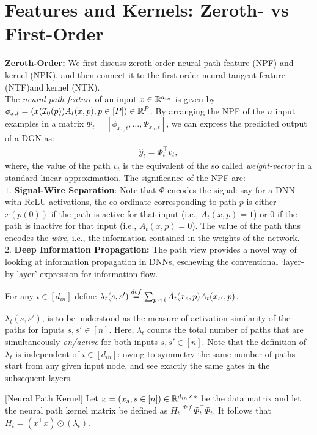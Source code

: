 \section{Features and Kernels: Zeroth- vs First-Order}
\textbf{Zeroth-Order:} We first discuss zeroth-order neural path feature (NPF) and kernel (NPK), and then connect it to the first-order neural tangent feature  (NTF)and kernel (NTK).\hfill\\
The \emph{neural path feature} of an input $x\in \mathbb{R}^{d_{in}}$ is given by $\phi_{x,t}=(x(\mathcal{I}_0(p))A_t(x,p) ,p\in[P])\in\mathbb{R}^P$. By arranging the NPF of the $n$ input examples in a matrix $\Phi_t=\left[\phi_{x_1,t},\ldots, \Phi_{x_n,t}\right]$, we can express the predicted output of a DGN as: \begin{align}\label{eq:npfbasic}\hat{y}_t=\Phi_t^\top v_t,\end{align}
where, the value of the path $v_t$ is the equivalent of the so called \emph{weight-vector} in a standard linear approximation. The significance of the NPF are:\hfill\\
$1.$ \textbf{Signal-Wire Separation}: Note that $\Phi$ encodes the signal: say for a DNN with ReLU activations, the co-ordinate corresponding to path $p$ is either $x(p(0))$ if the path is active for that input (i.e., $A_t(x,p)=1$) or $0$ if the path is inactive for that input  (i.e., $A_t(x,p)=0$). The value of the path thus encodes the \emph{wire}, i.e., the information contained in the weights of the network. \hfill\\
$2.$ \textbf{Deep Information Propagation:} The path view provides a novel way of looking at information propagation in DNNs, eschewing the conventional `layer-by-layer' expression for information flow.\hfill\\
\begin{definition}\label{def:lambda}
 For any $i\in [d_{in}]$ define $\lambda_t(s,s')\stackrel{def}{=}\sum_{p\rightsquigarrow i} A_t(x_s,p) A_t(x_{s'},p)$.
 \end{definition} 
$\lambda_t(s,s')$, is to be understood as the measure of activation similarity of the paths for inputs $s,s'\in[n]$. Here, $\lambda_t$ counts the total number of paths that are simultaneously \emph{on/active} for both inputs $s,s'\in[n]$. Note that the definition of $\lambda_t$ is independent of $i\in [d_{in}]$: owing to symmetry the same number of paths start from any given input node, and see exactly the same gates in the subsequent layers.
\begin{lemma}\label{lm:npk}[Neural Path Kernel] Let $x=(x_s,s\in [n])\in\mathbb{R}^{d_{in}\times n}$ be the data matrix and let the neural path kernel matrix be defined as $H_t\stackrel{def}=\Phi^\top_t\Phi_t$. It follows that $H_t= (x^\top x)\odot(\lambda_t)$. \end{lemma}
